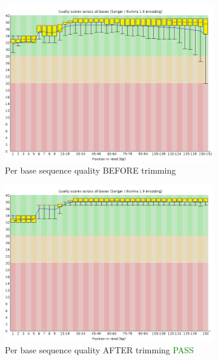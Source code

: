 \documentclass{article}
\begin{document}
\begin{figure}[htbp]
\centering
\begin{subfigure}{0.45\linewidth}
\includegraphics[width=\linewidth]{04-D15-22373-HT-Nextera-Myeloid-Val1-Repeat_S4_L001_R1_001_fastqc/Images/per_base_quality.png}
\caption{Per base sequence quality BEFORE trimming}
\end{subfigure}
\begin{subfigure}{0.45\linewidth}
\includegraphics[width=\linewidth]{04-D15-22373-HT-Nextera-Myeloid-Val1-Repeat_S4_L001_R1_001.qfilter_fastqc/Images/per_base_quality.png}
\caption{Per base sequence quality AFTER trimming \textcolor{green}{PASS}}
\end{subfigure}
\begin{subfigure}{0.45\linewidth}

\end{subfigure}
\end{figure}
\end{document}
